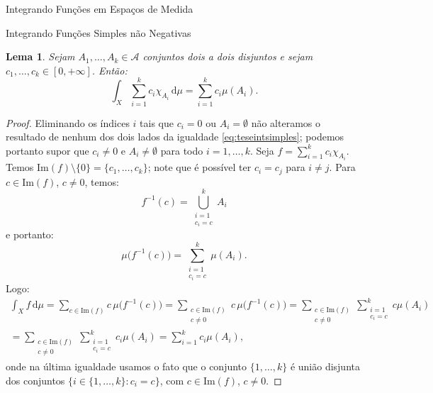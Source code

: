\documentclass[oneside,final,11pt]{amsbook}
\newcommand{\Img}{\mathrm{Im}}
\newcommand{\dd}{\mathrm d}
\theoremstyle{remark}\newtheorem{exercise}{Exercício}[chapter]
\theoremstyle{remark}\newtheorem{*exercise}[exercise]{\hbox to 0pt{\hskip 0pt minus 1fil*}Exercício}
\theoremstyle{definition}\newtheorem{exdefin}{Definição}[chapter]
\theoremstyle{plain}\newtheorem{teo}{Teorema}[section]
\theoremstyle{plain}\newtheorem{lem}[teo]{Lema}
\theoremstyle{plain}\newtheorem{prop}[teo]{Proposição}
\theoremstyle{plain}\newtheorem{cor}[teo]{Corolário}
\theoremstyle{definition}\newtheorem{defin}[teo]{Definição}
\theoremstyle{remark}\newtheorem{rem}[teo]{Observação}
\theoremstyle{definition}\newtheorem{notation}[teo]{Notação}
\theoremstyle{definition}\newtheorem{convention}[teo]{Convenção}
\theoremstyle{definition}\newtheorem{example}[teo]{Exemplo}
\numberwithin{section}{chapter}
\numberwithin{equation}{section}
\begin{document}
\begin{chapter}{Integrando Funções em Espaços de Medida}
\begin{section}{Integrando Funções Simples não Negativas}
\begin{lem}\label{thm:ciAi}
Sejam $A_1,\ldots,A_k\in\mathcal A$ conjuntos dois a dois disjuntos e sejam $c_1,\ldots,c_k\in[0,+\infty]$.
Então:
\begin{equation}\label{eq:teseintsimples}
\int_X\sum_{i=1}^kc_i\chi_{A_i}\,\dd\mu=\sum_{i=1}^kc_i\mu(A_i).
\end{equation}
\end{lem}
\begin{proof}
Eliminando os índices $i$ tais que $c_i=0$ ou $A_i=\emptyset$
não alteramos o resultado de nenhum dos dois lados da igualdade \eqref{eq:teseintsimples};
podemos portanto supor que $c_i\ne0$ e $A_i\ne\emptyset$ para todo $i=1,\ldots,k$.
Seja $f=\sum_{i=1}^kc_i\chi_{A_i}$. Temos $\Img(f)\setminus\{0\}=\{c_1,\ldots,c_k\}$;
note que é possível ter $c_i=c_j$ para $i\ne j$. Para $c\in\Img(f)$, $c\ne0$, temos:
\[f^{-1}(c)=\bigcup_{\substack{i=1\\c_i=c}}^kA_i\]
e portanto:
\[\mu\big(f^{-1}(c)\big)=\sum_{\substack{i=1\\c_i=c}}^k\mu(A_i).\]
Logo:
\begin{multline*}
\int_Xf\,\dd\mu=\!\!\!\sum_{c\in\Img(f)}\!\!c\,\mu\big(f^{-1}(c)\big)
=\!\!\!\sum_{\substack{c\in\Img(f)\\c\ne0}}\!\!c\,\mu\big(f^{-1}(c)\big)
=\!\!\!\sum_{\substack{c\in\Img(f)\\c\ne0}}\sum_{\substack{i=1\\c_i=c}}^kc\mu(A_i)
\\=\!\!\!\sum_{\substack{c\in\Img(f)\\c\ne0}}\sum_{\substack{i=1\\c_i=c}}^kc_i\mu(A_i)
=\sum_{i=1}^kc_i\mu(A_i),
\end{multline*}
onde na última igualdade usamos o fato que o conjunto $\{1,\ldots,k\}$ é união disjunta
dos conjuntos $\big\{i\in\{1,\ldots,k\}:c_i=c\big\}$, com $c\in\Img(f)$, $c\ne0$.
\end{proof}


\end{section}
\end{chapter}
\end{document}
